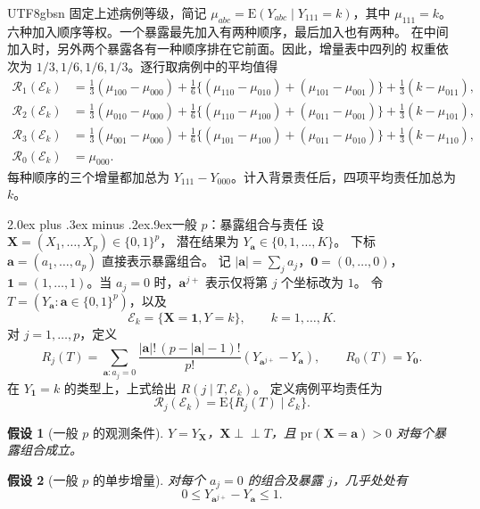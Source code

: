 \documentclass[11pt,a4paper]{article}
\makeatletter
\newcommand{\headingweight}{\ifPDFTeX\mdseries\else\bfseries\fi}
\renewcommand{\section}{\@startsection{section}{1}{0pt}
  {2.0ex plus .3ex minus .2ex}{.9ex}{\normalfont\large\headingweight}}
\newcommand{\indep}{\mathrel{\perp\!\!\!\perp}}
\theoremstyle{report}
\newtheorem{assumption}{假设}
\newcommand{\pr}{\mathrm{pr}}
\newcommand{\E}{\mathrm E}
\newcommand{\avec}{\boldsymbol a}
\newcommand{\zero}{\boldsymbol 0}
\newcommand{\one}{\boldsymbol 1}
\makeatother
\begin{document}
\begin{CJK*}{UTF8}{gbsn}
\medskip
\noindent{\headingweight 三个暴露各分多少分。}
固定上述病例等级，简记 $\mu_{abc}=\E(Y_{abc}\mid Y_{111}=k)$，其中 $\mu_{111}=k$。
六种加入顺序等权。一个暴露最先加入有两种顺序，最后加入也有两种。
在中间加入时，另外两个暴露各有一种顺序排在它前面。因此，增量表中四列的
权重依次为 $1/3,1/6,1/6,1/3$。逐行取病例中的平均值得
\[
\begin{aligned}
\mathcal R_1(\mathcal E_k)
 &=\tfrac13(\mu_{100}-\mu_{000})
   +\tfrac16\{(\mu_{110}-\mu_{010})+(\mu_{101}-\mu_{001})\}
   +\tfrac13(k-\mu_{011}),\\
\mathcal R_2(\mathcal E_k)
 &=\tfrac13(\mu_{010}-\mu_{000})
   +\tfrac16\{(\mu_{110}-\mu_{100})+(\mu_{011}-\mu_{001})\}
   +\tfrac13(k-\mu_{101}),\\
\mathcal R_3(\mathcal E_k)
 &=\tfrac13(\mu_{001}-\mu_{000})
   +\tfrac16\{(\mu_{101}-\mu_{100})+(\mu_{011}-\mu_{010})\}
   +\tfrac13(k-\mu_{110}),\\
\mathcal R_0(\mathcal E_k)&=\mu_{000}.
\end{aligned}
\]
每种顺序的三个增量都加总为 $Y_{111}-Y_{000}$。计入背景责任后，四项平均责任加总为 $k$。

\clearpage
\section{一般 $p$：暴露组合与责任}
设 $\boldsymbol X=(X_1,\ldots,X_p)\in\{0,1\}^p$，
潜在结果为 $Y_{\avec}\in\{0,1,\ldots,K\}$。
下标 $\avec=(a_1,\ldots,a_p)$ 直接表示暴露组合。
记 $|\avec|=\sum_j a_j$，$\zero=(0,\ldots,0)$，
$\one=(1,\ldots,1)$。当 $a_j=0$ 时，$\avec^{j+}$ 表示仅将第 $j$ 个坐标改为 $1$。
令 $T=(Y_{\avec}:\avec\in\{0,1\}^p)$，以及
\[
\mathcal E_k=\{\boldsymbol X=\one,Y=k\},\qquad k=1,\ldots,K.
\]
对 $j=1,\ldots,p$，定义
\begin{equation}\label{eq:general-score}
R_j(T)=
\sum_{\avec:a_j=0}
 \frac{|\avec|!\,(p-|\avec|-1)!}{p!}
 (Y_{\avec^{j+}}-Y_{\avec}),\qquad R_0(T)=Y_{\zero}.
\end{equation}
在 $Y_{\one}=k$ 的类型上，上式给出 $R(j\mid T,\mathcal E_k)$。
定义病例平均责任为
\[
\mathcal R_j(\mathcal E_k)=\E\{R_j(T)\mid\mathcal E_k\}.
\]

\begin{assumption}[一般 $p$ 的观测条件]\label{ass:p-data}
$Y=Y_{\boldsymbol X}$，$\boldsymbol X\indep T$，且
$\pr(\boldsymbol X=\avec)>0$ 对每个暴露组合成立。
\end{assumption}

\begin{assumption}[一般 $p$ 的单步增量]\label{ass:p-unit}
对每个 $a_j=0$ 的组合及暴露 $j$，几乎处处有
\[
0\le Y_{\avec^{j+}}-Y_{\avec}\le1.
\]
\end{assumption}


\end{CJK*}
\end{document}
